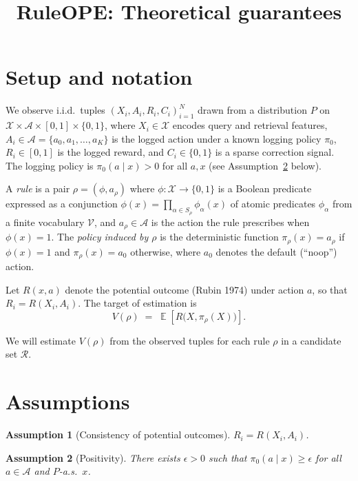 \documentclass[11pt]{article}
\title{RuleOPE: Theoretical guarantees}
\author{}
\date{}
\newtheorem{assumption}{Assumption}
\DeclareMathOperator{\E}{\mathbb{E}}
\begin{document}
\maketitle

\section{Setup and notation}

We observe i.i.d.\ tuples $(X_i, A_i, R_i, C_i)_{i=1}^N$ drawn from a
distribution $P$ on $\mathcal{X} \times \mathcal{A} \times [0, 1] \times
\{0, 1\}$, where $X_i \in \mathcal{X}$ encodes query and retrieval
features, $A_i \in \mathcal{A} = \{a_0, a_1, \ldots, a_K\}$ is the
logged action under a known logging policy $\pi_0$, $R_i \in [0, 1]$
is the logged reward, and $C_i \in \{0, 1\}$ is a sparse correction
signal.  The logging policy is $\pi_0(a \mid x) > 0$ for all $a, x$
(see Assumption~\ref{ass:positivity} below).

A \emph{rule} is a pair $\rho = (\phi, a_\rho)$ where
$\phi: \mathcal{X} \to \{0, 1\}$ is a Boolean predicate expressed as a
conjunction $\phi(x) = \prod_{\alpha \in S_\rho} \phi_\alpha(x)$ of
atomic predicates $\phi_\alpha$ from a finite vocabulary
$\mathcal{V}$, and $a_\rho \in \mathcal{A}$ is the action the rule
prescribes when $\phi(x) = 1$.  The \emph{policy induced by $\rho$} is
the deterministic function $\pi_\rho(x) = a_\rho$ if $\phi(x) = 1$ and
$\pi_\rho(x) = a_0$ otherwise, where $a_0$ denotes the default
(``noop'') action.

Let $R(x, a)$ denote the potential outcome (Rubin 1974) under
action $a$, so that $R_i = R(X_i, A_i)$.  The target of estimation is
\begin{equation}
V(\rho) \;=\; \E\left[R\bigl(X, \pi_\rho(X)\bigr)\right].
\label{eq:target}
\end{equation}

We will estimate $V(\rho)$ from the observed tuples for each rule
$\rho$ in a candidate set $\mathcal{R}$.

\section{Assumptions}

\begin{assumption}[Consistency of potential outcomes]\label{ass:consistency}
$R_i = R(X_i, A_i)$.
\end{assumption}

\begin{assumption}[Positivity]\label{ass:positivity}
There exists $\epsilon > 0$ such that $\pi_0(a \mid x) \geq \epsilon$
for all $a \in \mathcal{A}$ and $P$-a.s.\ $x$.
\end{assumption}
\end{document}
